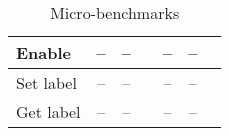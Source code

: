 \begin{table}
\begin{tabular}{l |c|c|c||c|c|c }
Enable             &  --     &  --     &         &  --     &   --    &
\\\hline%
Set label          &  --     &  --     &         &   --    &   --    &
\\\hline%
Get label          &  --     &  --     &         &   --    &   --    &
\\\bottomrule
\end{tabular}
\caption{\label{microbench} Micro-benchmarks}
\end{table}
